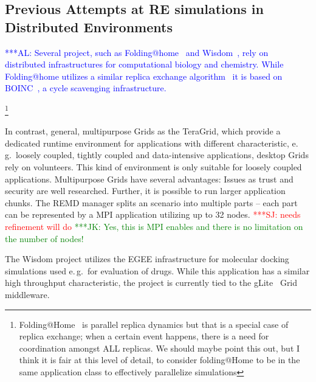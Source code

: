\documentclass[times, 10pt,twocolumn]{article}
\newcommand{\kimnote}[1]{ {\textcolor{green} { ***JK: #1 }}}
\newcommand{\alnote}[1]{ {\textcolor{blue} { ***AL: #1 }}}
\newcommand{\jhanote}[1]{ {\textcolor{red} { ***SJ: #1 }}}
\newcommand{\kimnote}[1]{}
\newcommand{\alnote}[1]{}
\newcommand{\jhanote}[1]{}
\begin{document}
\subsection{Previous Attempts at RE simulations in Distributed
  Environments}

\alnote{Several project, such as Folding@home~\cite{folding} and
  Wisdom~\cite{wisdom}, rely on distributed infrastructures for
  computational biology and chemistry. While Folding@home utilizes a
  similar replica exchange algorithm~\cite{PhysRevLett.86.4983} it is
  based on BOINC~\cite{1033223}, a cycle scavenging infrastructure.}


\footnote{Folding@Home~\cite{PhysRevLett.86.4983} is parallel replica
  dynamics but that is a special case of replica exchange; when a
  certain event happens, there is a need for coordination amongst ALL
  replicas. We should maybe point this out, but I think it is fair at
  this level of detail, to consider folding@Home to be in the same
  application class to effectively parallelize simulations}

In contrast, general, multipurpose Grids as the TeraGrid, which
provide a dedicated runtime environment for applications with
different characteristic, e.\,g.\ loosely coupled, tightly coupled and
data-intensive applications, desktop Grids rely on volunteers. This
kind of environment is only suitable for loosely coupled
applications. Multipurpose Grids have several advantages: Issues as
trust and security are well researched. Further, it is possible to run
larger application chunks. The REMD manager splits an scenario into
multiple parts -- each part can be represented by a MPI application
utilizing up to 32 nodes. \jhanote{needs refinement will do}
\kimnote{Yes, this is MPI enables and there is no limitation on the
  number of nodes!}

The Wisdom project utilizes the EGEE infrastructure for molecular
docking simulations used e.\,g.\ for evaluation of drugs. While this
application has a similar high throughput characteristic, the project
is currently tied to the gLite~\cite{glite2008} Grid middleware.
\end{document}
